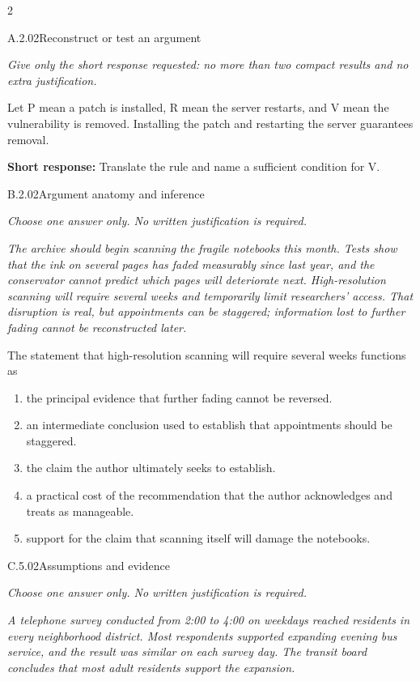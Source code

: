 \documentclass[9pt]{extarticle}
\newcommand{\choice}[1]{\item #1}
\begin{document}
\begin{multicols}{2}
\begin{DenseCoreProblem}{A.2.02}{Reconstruct or test an argument}
{\scriptsize\textit{Give only the short response requested: no more than two compact results and no extra justification.}\par}
Let P mean a patch is installed, R mean the server restarts, and V mean the vulnerability is removed. Installing the patch and restarting the server guarantees removal.

\textbf{Short response:} Translate the rule and name a sufficient condition for V.
\end{DenseCoreProblem}
\begin{DenseCoreProblem}{B.2.02}{Argument anatomy and inference}
{\scriptsize\textit{Choose one answer only. No written justification is required.}\par}
\emph{The archive should begin scanning the fragile notebooks this month. Tests show that the ink on several pages has faded measurably since last year, and the conservator cannot predict which pages will deteriorate next. High-resolution scanning will require several weeks and temporarily limit researchers' access. That disruption is real, but appointments can be staggered; information lost to further fading cannot be reconstructed later.}

The statement that high-resolution scanning will require several weeks functions as
\begin{enumerate}[label=(\alph*)]
  \choice{the principal evidence that further fading cannot be reversed.}
  \choice{an intermediate conclusion used to establish that appointments should be staggered.}
  \choice{the claim the author ultimately seeks to establish.}
  \choice{a practical cost of the recommendation that the author acknowledges and treats as manageable.}
  \choice{support for the claim that scanning itself will damage the notebooks.}
\end{enumerate}
\end{DenseCoreProblem}
\columnbreak
\begin{DenseCoreProblem}{C.5.02}{Assumptions and evidence}
{\scriptsize\textit{Choose one answer only. No written justification is required.}\par}
\emph{A telephone survey conducted from 2:00 to 4:00 on weekdays reached residents in every neighborhood district. Most respondents supported expanding evening bus service, and the result was similar on each survey day. The transit board concludes that most adult residents support the expansion.}


\end{DenseCoreProblem}
\end{multicols}
\end{document}
